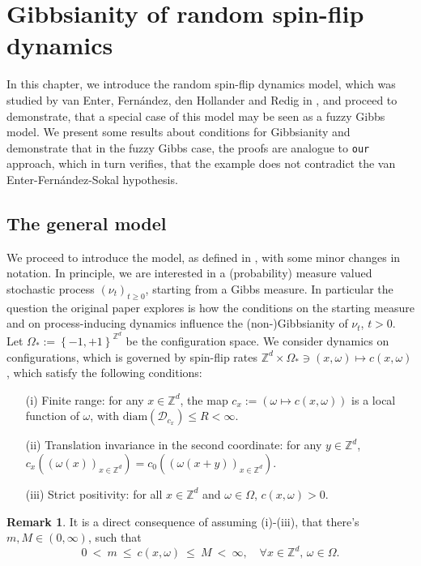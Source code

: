 \documentclass[12pt]{article}
\newcommand{\D}{\mathcal{D}}
\newcommand{\Z}{\mathbb{Z}}
\newcommand{\set}[1]{\left\{#1\right\}}
\newcommand{\1}{\mathbbm{1}}
\newcommand{\5}{\vspace{0.5cm}}
\theoremstyle{definition}
\newtheorem{rem}[thm]{Remark}
\begin{document}
\section{Gibbsianity of random spin-flip dynamics}\label{ch:4}

In this chapter, we introduce the random spin-flip dynamics model, which was studied by van Enter, Fern\'andez, den Hollander and Redig in \cite{EFHR}, and proceed to demonstrate, that a special case of this model may be seen as a fuzzy Gibbs model. We present some results about conditions for Gibbsianity and demonstrate that in the fuzzy Gibbs case, the proofs are analogue to \texttt{our} approach, which in turn verifies, that the example does not contradict the van Enter-Fern\'andez-Sokal hypothesis.


\subsection{The general model}

We proceed to introduce the model, as defined in \cite{EFHR}, with some minor changes in notation. In principle, we are interested in a (probability) measure valued stochastic process $(\nu_t)_{t\geq 0}$, starting from a Gibbs measure. In particular the question the original paper explores is how the conditions on the starting measure and on process-inducing dynamics influence the (non-)Gibbsianity of $\nu_t$, $t>0$. \\

Let $\Omega_*:=\set{-1,+1}^{\Z^d}$ be the configuration space. We consider dynamics on configurations, which is governed by spin-flip rates $\Z^d\times\Omega_*\ni(x,\omega)\mapsto c(x,\omega)$, which satisfy the following conditions:
\begin{itemize}
	\item[(i)] Finite range: for any $x\in\Z^d$, the map $c_x:=(\omega\mapsto c(x,\omega))$ is a local function of $\omega$, with $\mathrm{diam}(\D_{c_x})\leq R<\infty$.
	\item[(ii)] Translation invariance in the second coordinate: for any $y\in\Z^d$, $c_x((\omega(x))_{x\in\Z^d})=c_0((\omega(x+y))_{x\in\Z^d})$.
	\item[(iii)] Strict positivity: for all $x\in\Z^d$ and $\omega\in\Omega$, $c(x,\omega)>0$.
\end{itemize}

\begin{rem}
It is a direct consequence of assuming (i)-(iii), that there's $m,M\in(0,\infty)$, such that 
$$0 ~<~ m ~\leq~ c(x,\omega) ~\leq~ M ~<~ \infty, \quad \forall x\in\Z^d,\,\omega\in\Omega.$$
\end{rem}
\end{document}
